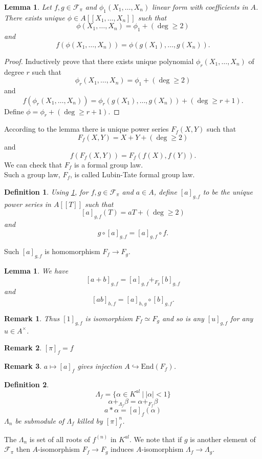 \documentclass[twoside, 12pt]{iiser-thesis}
\newtheorem{lem}[thm]{ Lemma}
\newtheorem{rem}{Remark}[section]
\newtheorem{defi}{ Definition}[section]
\begin{document}
\begin{lem}\label{ltmainlemma}
Let $f,g \in \mathcal F _\pi$ and $\phi _1(X_1, \dots, X_n)$ linear form with coefficients in $A$. There exists unique $\phi \in A[[X_1, \dots ,X_n]]$ such that $$\phi (X_1, \dots ,X_n) =\phi _1 + (\deg \geq 2)$$ and $$f(\phi (X_1, \dots , X_n))=\phi (g(X_1), \dots , g(X_n)).$$
\end{lem}
\begin{proof}
Inductively prove that there exists unique polynomial $\phi _r(X_1, \dots , X_n)$ of degree $r$ such that  $$\phi _r (X_1, \dots, X_n) = \phi _1 + (\deg \geq 2)$$ and $$ f(\phi _r (X_1, \dots , X_n))=\phi _r(g(X_1), \dots , g(X_n)) + (\deg \geq r+1).$$
Define $\phi =\phi _r + (\deg \geq r+1)$. 
\end{proof}
According to the lemma there is unique power series $F_f(X,Y)$ such that $$F_f(X,Y)=X +Y + (\deg \geq 2)$$ and $$f(F_f(X,Y)) =F_f(f(X),f(Y)).$$ 
We can check that $F_f$ is a formal group law. \\
Such a group law, $F_f$, is called Lubin-Tate formal group law. 
\begin{defi}
Using \cref{ltmainlemma}, for $f,g \in \mathcal F _\pi$ and $a\in A$, define $[a]_{g,f}$ to be the unique power series in $A[[T]]$ such that $$[a]_{g,f}(T) =aT + (\deg \geq 2)$$ and $$g \circ [a]_{g,f}=[a]_{g,f}\circ f.$$
\end{defi}
Such $[a]_{g,f}$ is homomorphism $F_f \rightarrow F_g.$ 
\begin{lem}
We have $$ [a+b]_{g,f}=[a]_{g,f}+_{F_g} [b]_{g,f}$$ and $$ [ab]_{h,f} =[a]_{h,g}\circ [b]_{g,f}.$$
\end{lem}
\begin{rem}
Thus $[1]_{g,f}$ is isomorphism $F_f \simeq F_g$ and so is any $[u]_{g,f}$ for any $u \in A^\times$.
\end{rem}
\begin{rem}
$[\pi]_f =f $
\end{rem}
\begin{rem}
$ a\mapsto [a]_f$ gives injection $A \hookrightarrow \text{End} (F_f)$.
\end{rem}
\begin{defi}
$$\Lambda _f = \{ \alpha \in K^{al} \ | \ |\alpha | <1\} $$
$$ \alpha +_{\Lambda _f} \beta = \alpha +_{F_f} \beta $$
$$ a * \alpha =[a]_f (\alpha )$$
$\Lambda _n$ be submodule of $\Lambda _f$ killed by $[\pi ] _f^n$. 
\end{defi}
The $\Lambda _n$ is set of all roots of $f^{(n)}$ in $K^{al}$. We note that if $g$ is another element of $\mathcal F _ \pi$ then $A$-isomorphism $F_f \rightarrow F_g$ induces $A$-isomorphism $\Lambda _f \rightarrow \Lambda _g$.
\end{document}
